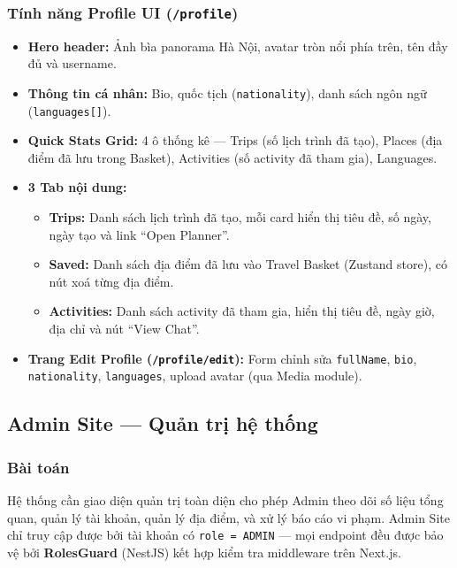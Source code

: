 \documentclass[12pt,a4paper]{article}
\begin{document}
\subsubsection{Tính năng Profile UI (\texttt{/profile})}

\begin{itemize}
  \item \textbf{Hero header:} Ảnh bìa panorama Hà Nội, avatar tròn nổi
        phía trên, tên đầy đủ và username.
  \item \textbf{Thông tin cá nhân:} Bio, quốc tịch (\texttt{nationality}),
        danh sách ngôn ngữ (\texttt{languages[]}).
  \item \textbf{Quick Stats Grid:} 4 ô thống kê --- Trips (số lịch trình
        đã tạo), Places (địa điểm đã lưu trong Basket), Activities (số
        activity đã tham gia), Languages.
  \item \textbf{3 Tab nội dung:}
        \begin{itemize}
          \item \textbf{Trips:} Danh sách lịch trình đã tạo, mỗi card
                hiển thị tiêu đề, số ngày, ngày tạo và link ``Open Planner''.
          \item \textbf{Saved:} Danh sách địa điểm đã lưu vào Travel Basket
                (Zustand store), có nút xoá từng địa điểm.
          \item \textbf{Activities:} Danh sách activity đã tham gia, hiển
                thị tiêu đề, ngày giờ, địa chỉ và nút ``View Chat''.
        \end{itemize}
  \item \textbf{Trang Edit Profile (\texttt{/profile/edit}):} Form chỉnh
        sửa \texttt{fullName}, \texttt{bio}, \texttt{nationality},
        \texttt{languages}, upload avatar (qua Media module).
\end{itemize}

\subsection{Admin Site --- Quản trị hệ thống}

\subsubsection{Bài toán}

Hệ thống cần giao diện quản trị toàn diện cho phép Admin theo dõi số liệu
tổng quan, quản lý tài khoản, quản lý địa điểm, và xử lý báo cáo vi phạm.
Admin Site chỉ truy cập được bởi tài khoản có \texttt{role = ADMIN} ---
mọi endpoint đều được bảo vệ bởi \textbf{RolesGuard} (NestJS) kết hợp
kiểm tra middleware trên Next.js.
\end{document}
